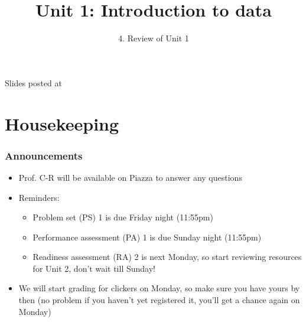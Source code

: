 \documentclass[11pt,containsverbatim,handout,xcolor=xelatex,dvipsnames,table]{beamer}
\title{Unit 1: Introduction to data}
\subtitle{4. Review of Unit 1}
\author{\CourseName}
\date{}
\institute{\InstituteName}
\begin{document}



\begin{frame}[plain]

\titlepage

\vfill

{\scriptsize {} \hfill Slides posted at  \webURL{\CourseSite}}

\addtocounter{framenumber}{-1} 

\end{frame}


\section{Housekeeping}


\begin{frame}
\frametitle{Announcements}

\begin{itemize}

\item Prof. C-R will be available on Piazza to answer any questions

\item Reminders:
\begin{itemize}
\item Problem set (PS) 1 is due Friday night (11:55pm)

\item Performance assessment (PA) 1 is due Sunday night (11:55pm)

\item Readiness assessment (RA) 2 is next Monday, so start reviewing resources for Unit 2, 
don't wait till Sunday!
\end{itemize}

\item We will start grading for clickers on Monday, so make sure you have yours by then (no problem if you
haven't yet registered it, you'll get a chance again on Monday)

\end{itemize}

\end{frame}

\end{document}

